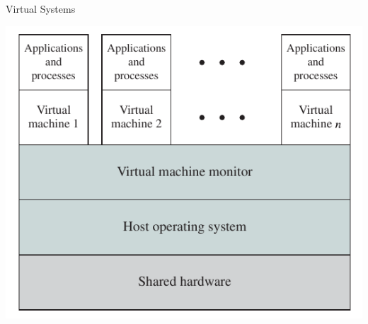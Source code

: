 \documentclass[10pt]{beamer}
\begin{document}
\begin{frame}{Virtual Systems}
 \begin{center}
      \includegraphics[keepaspectratio, width=\textwidth, height=\textheight-2\baselineskip-2\baselineskip]{img/013_virtual_machine.png} \\ 
 \end{center}
\end{frame}
\end{document}
